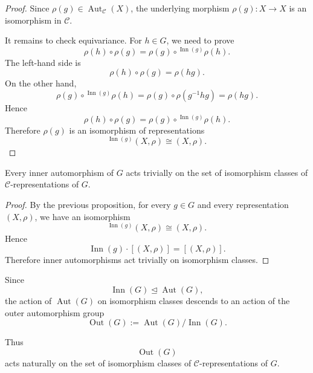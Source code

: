 \begin{proof}
    Since \(\rho(g)\in \operatorname{Aut}_{\mathcal{C}}(X)\), the underlying
    morphism \(\rho(g):X\to X\) is an isomorphism in \(\mathcal{C}\).

    It remains to check equivariance. For \(h\in G\), we need to prove
    \[
        \rho(h)\circ \rho(g)
        =
        \rho(g)\circ {}^{\operatorname{Inn}(g)}\rho(h).
    \]
    The left-hand side is
    \[
        \rho(h)\circ \rho(g)=\rho(hg).
    \]
    On the other hand,
    \[
        \rho(g)\circ {}^{\operatorname{Inn}(g)}\rho(h)
        =
        \rho(g)\circ \rho(g^{-1}hg)
        =
        \rho(hg).
    \]
    Hence
    \[
        \rho(h)\circ \rho(g)
        =
        \rho(g)\circ {}^{\operatorname{Inn}(g)}\rho(h).
    \]
    Therefore \(\rho(g)\) is an isomorphism of representations
    \[
        {}^{\operatorname{Inn}(g)}(X,\rho)
        \cong
        (X,\rho).
    \]
\end{proof}

\begin{corollary}
    Every inner automorphism of \(G\) acts trivially on the set of isomorphism
    classes of \(\mathcal{C}\)-representations of \(G\).
\end{corollary}

\begin{proof}
    By the previous proposition, for every \(g\in G\) and every representation
    \((X,\rho)\), we have an isomorphism
    \[
        {}^{\operatorname{Inn}(g)}(X,\rho)
        \cong
        (X,\rho).
    \]
    Hence
    \[
        \operatorname{Inn}(g)\cdot [(X,\rho)]
        =
        [(X,\rho)].
    \]
    Therefore inner automorphisms act trivially on isomorphism classes.
\end{proof}

Since
\[
    \operatorname{Inn}(G)\trianglelefteq \operatorname{Aut}(G),
\]
the action of \(\operatorname{Aut}(G)\) on isomorphism classes descends to an
action of the outer automorphism group
\[
    \operatorname{Out}(G)
    :=
    \operatorname{Aut}(G)/\operatorname{Inn}(G).
\]

Thus
\[
    \operatorname{Out}(G)
\]
acts naturally on the set of isomorphism classes of \(\mathcal{C}\)-representations
of \(G\).
